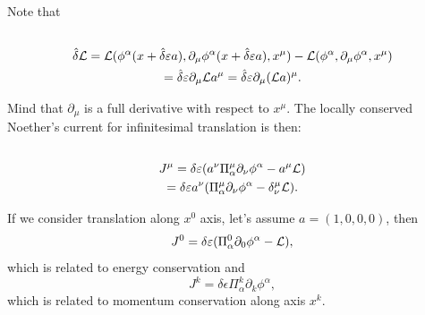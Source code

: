 \documentclass[main.tex]{subfiles}
\begin{document}
Note that 
\begin{multline*}
\\
\hat{\delta} \mathcal{L} = \mathcal{L}(\phi^\alpha(x + \hat{\delta}\varepsilon a), \partial_\mu \phi^\alpha(x + \hat{\delta}\varepsilon a), x^\mu) -
\mathcal{L}(\phi^\alpha, \partial_\mu \phi^\alpha, x^\mu)
\\ = \hat{\delta}\varepsilon \partial_\mu\mathcal{L} a^\mu = \hat{\delta}\varepsilon \partial_\mu(\mathcal{L} a)^\mu.
\\
\end{multline*}

Mind that $\partial_\mu$ is a full derivative with respect to $x^\mu$. The locally conserved Noether's current for infinitesimal translation is then:
\begin{multline*}\\
J^\mu = \delta \varepsilon(a^\nu \Pi_\alpha^\mu \partial_\nu \phi^\alpha - a^\mu\mathcal{L})
\\ = \delta \varepsilon a^\nu ( \Pi_\alpha^\mu \partial_\nu \phi^\alpha - \delta^\mu_\nu\mathcal{L}).
\\
\end{multline*}

If we consider translation along $x^0$ axis, let's assume $a = (1, 0, 0, 0)$, then 
\begin{equation}
J^0 = \delta\varepsilon(\Pi_\alpha^0 \partial_0 \phi^\alpha - \mathcal{L}),
\end{equation}
which is related to energy conservation
and 
\begin{equation}
J^k = \delta \epsilon \Pi_\alpha^k \partial_k \phi^\alpha,
\end{equation}
which is related to momentum conservation along axis $x^k$.
  
\end{document}
